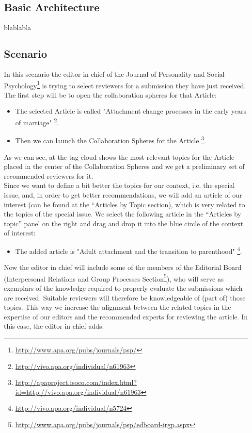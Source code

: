 \subsection{Basic Architecture}
blablabla
\subsection{Scenario}
In this scenario the editor in chief of the Journal of Personality and Social Psychology\footnote{\url{http://www.apa.org/pubs/journals/psp/}} is trying to select reviewers for a submission they have just received. The first step will be to open the collaboration spheres for that Article: 
\begin{itemize}
  \item The selected Article is called "Attachment change processes in the early years of marriage" \footnote{\url{http://vivo.apa.org/individual/n61963}}.
  \item Then we can launch the Collaboration Spheres for the Article \footnote{\url{http://apaproject.isoco.com/index.html?id=http://vivo.apa.org/individual/n61963}}.
\end{itemize}
As we can see, at the tag cloud shows the most relevant topics for the Article placed in the center of the Collaboration Spheres and we get a preliminary set of recommended reviewers for it.\\
Since we want to define a bit better the topics for our context, i.e. the special issue, and, in order to get better recommendations, we will add an article of our interest (can be found at the “Articles by Topic section), which is very related to the topics of the special issue. We select the following article in the “Articles by topic” panel on the right and drag and drop it into the blue circle of the context of interest:
\begin{itemize}
  \item The added article is "Adult attachment and the transition to parenthood" \footnote{\url{http://vivo.apa.org/individual/n5724}}.
\end{itemize}
Now the editor in chief will include some of the members of the Editorial Board (Interpersonal Relations and Group Processes Section\footnote{\url{http://www.apa.org/pubs/journals/psp/edboard-irgp.aspx}}), who will serve as exemplars of the knowledge required to properly evaluate the submissions which are received. Suitable reviewers will therefore be knowledgeable of (part of) those topics. This way we increase the alignment between the related topics in the expertise of our editors and the recommended experts for reviewing the article. In this case, the editor in chief adds:
